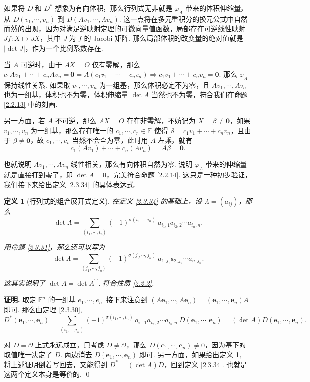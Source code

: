 \documentclass[10pt,openany]{article}
\theoremstyle{thmstyle} %
\theoremstyle{defstyle} %
\newtheorem{definition}[theorem]{定义}
\theoremstyle{prostyle} %
\theoremstyle{exastyle}
\theoremstyle{remstyle}
\renewenvironment{proof}[1][证明]{\par\underline{\textbf{#1.}} \;\fangsong}{\qed\par}
\newcommand{\T}{^{\text{T}}}
\newcommand{\F}{\mathbb{F}}
\newcommand{\bme}{\bm{e}}
\begin{document}
如果将 \( D \) 和 \( D^* \) 想象为有向体积，那么行列式无非就是 \( \varphi_{A} \) 带来的体积伸缩量，从 \( D(v_1,\cdots,v_n) \) 到 \( D(Av_1,\cdots,Av_n) \). 这一点将在多元重积分的换元公式中自然而然的出现，因为对满足逆映射定理的可微向量值函数，局部存在可逆线性映射 \( Jf: X \mapsto JX \)，其中 \( J \) 为 \( f \) 的 Jacobi 矩阵. 那么局部体积的改变量的绝对值就是 \( |\det J| \)，作为一个比例系数存在.

当 \( A \) 可逆时，由于 \( AX=O \) 仅有零解，那么 \( c_1Av_1+\cdots+c_nAv_n= \bm{0}= A(c_1v_1+\cdots+c_nv_n) \Rightarrow c_1v_1+\cdots+c_nv_n=\bm{0} \). 那么 \( \varphi_{A} \) 保持线性关系. 如果取 \( v_1,\cdots,v_n \) 为一组基，那么体积必定不为零，且 \( Av_1,\cdots,Av_n \) 也为一组基，体积也不为零，体积伸缩量 \( \det A \) 当然也不为零，符合我们在命题 \ref{2.2.13} 中的刻画. 


另一方面，若 \( A \) 不可逆，那么 \( AX=O \) 存在非零解，不妨记为 \( X=\beta \neq \bm{0} \)，如果 \( v_1,\cdots,v_n \) 为一组基，那么存在唯一的 \( c_1,\cdots,c_n \in \F \) 使得 \( \beta=c_1v_1+\cdots+c_nv_n \)，且由于 \( \beta \neq \bm{0} \)，故 \( c_1,\cdots,c_n \) 当然不会全为零，此时用 \( A \) 左乘，就有
\[ c_1(Av_1)+\cdots+c_n(Av_n)=A\beta=\bm{0}. \]

也就说明 \( Av_1,\cdots,Av_n \) 线性相关，那么有向体积自然为零. 说明 \( \varphi_{A} \) 带来的伸缩量就是直接打到零了，即 \( \det A=0 \)，完美符合命题 \ref{2.2.14}. 这只是一种初步验证，我们接下来给出定义 \ref{2.3.34} 的具体表达式.

\begin{definition}[行列式的组合展开式定义] \label{2.3.35}
	在定义 \ref{2.3.34} 的基础上，设 \( A=(a_{ij}) \)，那么
	\[ \det A= \sum_{(i_1,\cdots,i_n)}^{} (-1)^{\sigma(i_1,\cdots,i_n)} \ a_{i_1,1}a_{i_2,2}\cdots a_{i_n,n}. \]
	
	用命题 \ref{2.3.31}，那么还可以写为
	\[ \det A= \sum_{(j_1,\cdots,j_n)}^{} (-1)^{\sigma(j_1,\cdots,j_n)} \ a_{1,j_1}a_{2,j_2}\cdots a_{n,j_n}. \]
	
	这其实说明了 \( \det A=\det A\T \). 符合性质 \ref{2.2.2}. 
\end{definition}

\begin{proof}
	取定 \( \F^n \) 的一组基 \( e_1,\cdots,e_n \). 接下来注意到 \( (A\bme_1,\cdots,A\bme_n)=(\bme_1,\cdots,\bme_n)A \) 即可. 那么由定理 \ref{2.3.30},
	\[ D^*(\bme_1,\cdots,\bme_n)=\sum_{(i_1,\cdots,i_n)}^{} (-1)^{\sigma(i_1,\cdots,i_n)} \ a_{i_1,1}a_{i_2,2}\cdots a_{i_n,n} \ D(\bme_1,\cdots,\bme_n)=(\det A) D(\bme_1,\cdots,\bme_n). \]
	
	对 \( D = \mathcal{O} \) 上式永远成立，只考虑 \( D \neq \mathcal{O} \)，那么 \( D(\bme_1,\cdots,\bme_n) \neq 0 \)，因为基下的取值唯一决定了 \( D \). 两边消去 \( D(\bme_1,\cdots,\bme_n) \) 即可. 另一方面，如果给出定义 \ref{2.3.35}，将上述证明倒着写回去，又能得到 \( D^*=(\det A) D \)，回到定义 \ref{2.3.34}. 也就是这两个定义本身是等价的.
\end{proof}
\end{document}
